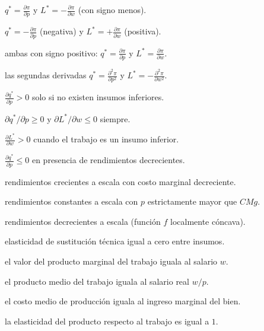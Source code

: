\begin{opts}
    \item $q^* = \frac{\partial \pi}{\partial p}$ y $L^* = -\frac{\partial \pi}{\partial w}$ (con signo menos).
    \item $q^* = -\frac{\partial \pi}{\partial p}$ (negativa) y $L^* = +\frac{\partial \pi}{\partial w}$ (positiva).
    \item ambas con signo positivo: $q^* = \frac{\partial \pi}{\partial p}$ y $L^* = \frac{\partial \pi}{\partial w}$.
    \item las segundas derivadas $q^* = \frac{\partial^2 \pi}{\partial p^2}$ y $L^* = -\frac{\partial^2 \pi}{\partial w^2}$.
\end{opts}

\begin{opts}
    \item $\frac{\partial q^*}{\partial p} > 0$ solo si no existen insumos inferiores.
    \item $\partial q^*/\partial p \ge 0$ y $\partial L^*/\partial w \le 0$ siempre.
    \item $\frac{\partial L^*}{\partial w} > 0$ cuando el trabajo es un insumo inferior.
    \item $\frac{\partial q^*}{\partial p} \le 0$ en presencia de rendimientos decrecientes.
\end{opts}

\begin{opts}
    \item rendimientos crecientes a escala con costo marginal decreciente.
    \item rendimientos constantes a escala con $p$ estrictamente mayor que $CMg$.
    \item rendimientos decrecientes a escala (función $f$ localmente cóncava).
    \item elasticidad de sustitución técnica igual a cero entre insumos.
\end{opts}

\begin{opts}
    \item el valor del producto marginal del trabajo iguala al salario $w$.
    \item el producto medio del trabajo iguala al salario real $w/p$.
    \item el costo medio de producción iguala al ingreso marginal del bien.
    \item la elasticidad del producto respecto al trabajo es igual a $1$.
\end{opts}

